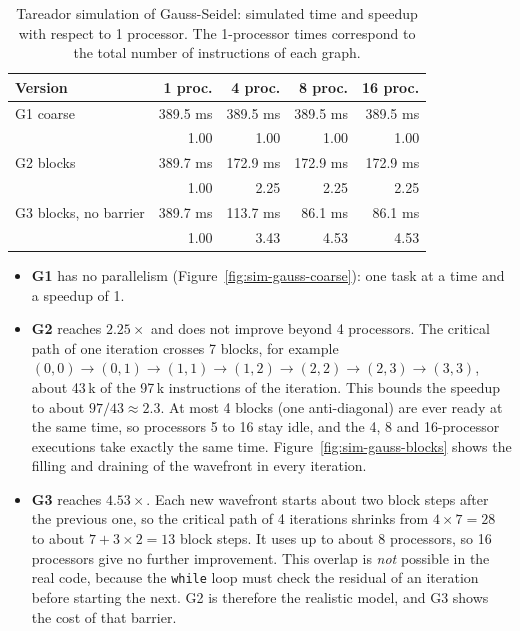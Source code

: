 \documentclass[11pt,a4paper]{article}
\begin{document}
\begin{table}[H]
\centering
\begin{tabular}{lrrrr}
\toprule
Version & 1 proc. & 4 proc. & 8 proc. & 16 proc. \\
\midrule
G1 coarse            & 389.5 ms & 389.5 ms & 389.5 ms & 389.5 ms \\
                     & 1.00     & 1.00     & 1.00     & 1.00 \\
G2 blocks            & 389.7 ms & 172.9 ms & 172.9 ms & 172.9 ms \\
                     & 1.00     & 2.25     & 2.25     & 2.25 \\
G3 blocks, no barrier & 389.7 ms & 113.7 ms & 86.1 ms  & 86.1 ms \\
                     & 1.00     & 3.43     & 4.53     & 4.53 \\
\bottomrule
\end{tabular}
\caption{Tareador simulation of Gauss-Seidel: simulated time and speedup with respect to 1 processor. The 1-processor times correspond to the total number of instructions of each graph.}
\label{tab:tareador-gauss}
\end{table}

\begin{itemize}
  \item \textbf{G1} has no parallelism (Figure~\ref{fig:sim-gauss-coarse}): one task at a time and a speedup of 1.
  \item \textbf{G2} reaches $2.25\times$ and does not improve beyond 4 processors. The critical path of one iteration crosses 7 blocks, for example $(0,0)\to(0,1)\to(1,1)\to(1,2)\to(2,2)\to(2,3)\to(3,3)$, about 43\,k of the 97\,k instructions of the iteration. This bounds the speedup to about $97/43 \approx 2.3$. At most 4 blocks (one anti-diagonal) are ever ready at the same time, so processors 5 to 16 stay idle, and the 4, 8 and 16-processor executions take exactly the same time. Figure~\ref{fig:sim-gauss-blocks} shows the filling and draining of the wavefront in every iteration.
  \item \textbf{G3} reaches $4.53\times$. Each new wavefront starts about two block steps after the previous one, so the critical path of 4 iterations shrinks from $4\times7=28$ to about $7+3\times2=13$ block steps. It uses up to about 8 processors, so 16 processors give no further improvement. This overlap is \emph{not} possible in the real code, because the \texttt{while} loop must check the residual of an iteration before starting the next. G2 is therefore the realistic model, and G3 shows the cost of that barrier.
\end{itemize}
\end{document}
